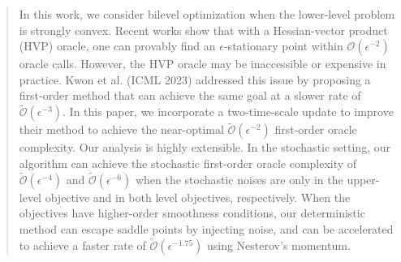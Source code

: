 \documentclass[twoside,11pt]{article}
\begin{document}
\begin{abstract}%
In this work, we consider bilevel optimization when the lower-level problem is strongly convex.
Recent works show that with a Hessian-vector product (HVP) oracle, one can provably find an $\epsilon$-stationary point within ${\mathcal{O}}(\epsilon^{-2})$ oracle calls. However, the HVP oracle may be inaccessible or expensive in practice.
Kwon et al. (ICML 2023) addressed this issue by proposing a first-order method that can achieve the same goal at a slower rate of $\tilde{\mathcal{O}}(\epsilon^{-3})$. 
In this paper, we incorporate a two-time-scale update to improve their method
to achieve the near-optimal $\tilde {\mathcal{O}}(\epsilon^{-2})$ first-order oracle complexity.
Our analysis is highly extensible. In the stochastic setting,
our algorithm can achieve the stochastic first-order oracle complexity of $\tilde {\mathcal{O}}(\epsilon^{-4})$ and $\tilde {\mathcal{O}}(\epsilon^{-6})$ when the stochastic noises are only in the
 upper-level objective and in both level objectives, respectively.
 When the objectives have higher-order smoothness conditions, our deterministic method can escape saddle points by injecting noise, and can be accelerated to 
achieve a faster rate of $\tilde {\mathcal{O}}(\epsilon^{-1.75})$ using Nesterov's momentum.
% 
\end{abstract}
\end{document}
